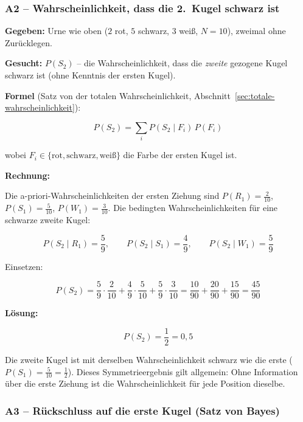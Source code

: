 \subsubsection*{A2 – Wahrscheinlichkeit, dass die 2.\ Kugel schwarz ist}

\begin{beispiel}

\textbf{Gegeben:} Urne wie oben ($2$ rot, $5$ schwarz, $3$ weiß, $N = 10$),
zweimal ohne Zurücklegen.

\textbf{Gesucht:} $P(S_2)$ -- die Wahrscheinlichkeit, dass die \emph{zweite}
gezogene Kugel schwarz ist (ohne Kenntnis der ersten Kugel).

\textbf{Formel} (Satz von der totalen Wahrscheinlichkeit,
Abschnitt~\ref{sec:totale-wahrscheinlichkeit}):

$$
P(S_2) = \sum_{i} P(S_2 \mid F_i)\, P(F_i)
$$

wobei $F_i \in \{\text{rot}, \text{schwarz}, \text{weiß}\}$ die Farbe der ersten
Kugel ist.

\textbf{Rechnung:}

Die a-priori-Wahrscheinlichkeiten der ersten Ziehung sind
$P(R_1) = \tfrac{2}{10}$, $P(S_1) = \tfrac{5}{10}$, $P(W_1) = \tfrac{3}{10}$.
Die bedingten Wahrscheinlichkeiten für eine schwarze zweite Kugel:

$$
P(S_2 \mid R_1) = \frac{5}{9}, \qquad
P(S_2 \mid S_1) = \frac{4}{9}, \qquad
P(S_2 \mid W_1) = \frac{5}{9}
$$

Einsetzen:

$$
P(S_2) = \frac{5}{9}\cdot\frac{2}{10} + \frac{4}{9}\cdot\frac{5}{10}
       + \frac{5}{9}\cdot\frac{3}{10}
       = \frac{10}{90} + \frac{20}{90} + \frac{15}{90}
       = \frac{45}{90}
$$

\textbf{Lösung:}

$$
\boxed{P(S_2) = \frac{1}{2} = 0{,}5}
$$

Die zweite Kugel ist mit derselben Wahrscheinlichkeit schwarz wie die erste
($P(S_1) = \tfrac{5}{10} = \tfrac{1}{2}$). Dieses Symmetrieergebnis gilt
allgemein: Ohne Information über die erste Ziehung ist die Wahrscheinlichkeit
für jede Position dieselbe.

\end{beispiel}

\subsubsection*{A3 – Rückschluss auf die erste Kugel (Satz von Bayes)}

